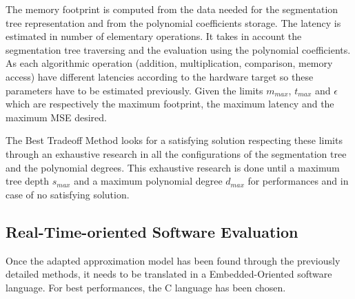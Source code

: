 \documentclass[fleqn,10pt]{SelfArx} %
\begin{document}
The memory footprint is computed from the data needed for the segmentation tree representation and from the polynomial coefficients storage.
The latency is estimated in number of elementary operations. It takes in account the segmentation tree traversing and the evaluation using the polynomial coefficients. As each algorithmic operation (addition, multiplication, comparison, memory access) have different latencies according to the hardware target so these parameters have to be estimated previously.
Given the limits $m_{max}$, $t_{max}$ and $\epsilon$ which are respectively the maximum footprint, the maximum latency and the maximum MSE desired.

The Best Tradeoff Method looks for a satisfying solution respecting these limits through an exhaustive research in all the configurations of the segmentation tree and the polynomial degrees. This exhaustive research is done until a maximum tree depth $s_{max}$ and a maximum polynomial degree $d_{max}$ for performances and in case of no satisfying solution.

\subsection{Real-Time-oriented Software Evaluation}

Once the adapted approximation model has been found through the previously detailed methods, it needs to be translated in a Embedded-Oriented software language. For best performances, the C language has been chosen.
\end{document}
